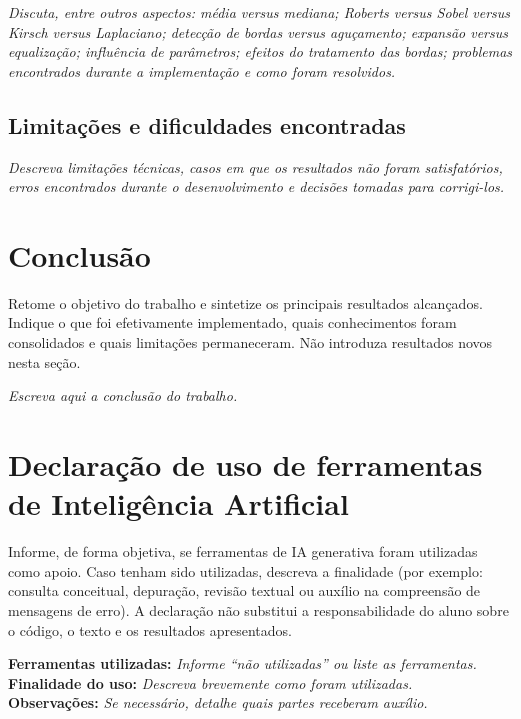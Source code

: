 \documentclass[11pt,a4paper]{article}
\newcommand{\placeholder}[1]{\textcolor{muted}{\textit{#1}}}
\begin{document}
\placeholder{Discuta, entre outros aspectos: média versus mediana; Roberts versus Sobel versus Kirsch versus Laplaciano; detecção de bordas versus aguçamento; expansão versus equalização; influência de parâmetros; efeitos do tratamento das bordas; problemas encontrados durante a implementação e como foram resolvidos.}

\subsection{Limitações e dificuldades encontradas}
\placeholder{Descreva limitações técnicas, casos em que os resultados não foram satisfatórios, erros encontrados durante o desenvolvimento e decisões tomadas para corrigi-los.}

\section{Conclusão}

\begin{orientacao}
Retome o objetivo do trabalho e sintetize os principais resultados alcançados. Indique o que foi efetivamente implementado, quais conhecimentos foram consolidados e quais limitações permaneceram. Não introduza resultados novos nesta seção.
\end{orientacao}

\placeholder{Escreva aqui a conclusão do trabalho.}

\section{Declaração de uso de ferramentas de Inteligência Artificial}

\begin{orientacao}
Informe, de forma objetiva, se ferramentas de IA generativa foram utilizadas como apoio. Caso tenham sido utilizadas, descreva a finalidade (por exemplo: consulta conceitual, depuração, revisão textual ou auxílio na compreensão de mensagens de erro). A declaração não substitui a responsabilidade do aluno sobre o código, o texto e os resultados apresentados.
\end{orientacao}

\begin{campo}
\textbf{Ferramentas utilizadas:} \placeholder{Informe ``não utilizadas'' ou liste as ferramentas.}\\[3mm]
\textbf{Finalidade do uso:} \placeholder{Descreva brevemente como foram utilizadas.}\\[3mm]
\textbf{Observações:} \placeholder{Se necessário, detalhe quais partes receberam auxílio.}
\end{campo}
\end{document}
